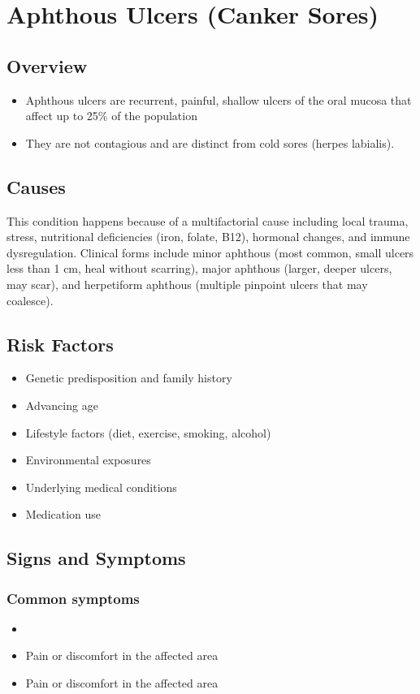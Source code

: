 \chapter{Aphthous Ulcers (Canker Sores)}
\label{sec:Aphthous Ulcers (Canker Sores)}

\section{Overview}


\begin{itemize}[noitemsep]
  \item Aphthous ulcers are recurrent, painful, shallow ulcers of the oral mucosa that affect up to 25\% of the population
  \item They are not contagious and are distinct from cold sores (herpes labialis).
\end{itemize}
\section{Causes}
This condition happens because of a multifactorial cause including local trauma, stress, nutritional deficiencies (iron, folate, B12), hormonal changes, and immune dysregulation. Clinical forms include minor aphthous (most common, small ulcers less than 1 cm, heal without scarring), major aphthous (larger, deeper ulcers, may scar), and herpetiform aphthous (multiple pinpoint ulcers that may coalesce).     
\section{Risk Factors}

\begin{itemize}[noitemsep]
  \item Genetic predisposition and family history
  \item Advancing age
  \item Lifestyle factors (diet, exercise, smoking, alcohol)
  \item Environmental exposures
  \item Underlying medical conditions
  \item Medication use
\end{itemize}
\section{Signs and Symptoms}

\subsection{Common symptoms}
\begin{itemize}[noitemsep]
  \item \item Pain or discomfort in the affected area    \item Pain or discomfort in the affected area
  \end{itemize}

